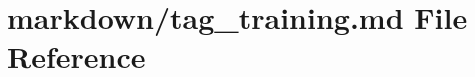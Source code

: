 \hypertarget{tag__training_8md}{}\section{markdown/tag\+\_\+training.md File Reference}
\label{tag__training_8md}
